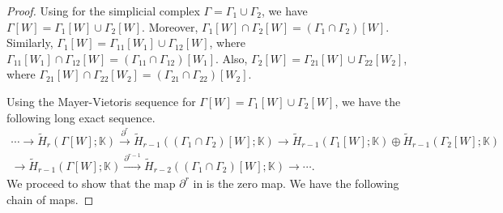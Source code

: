 \documentclass[12pt,reqno]{amsart}
\theoremstyle{definition}
\newcommand{\K}{\mathbb K}
\begin{document}
\begin{proof}
    Using  for the simplicial complex $\Gamma=\Gamma_1\cup\Gamma_2$, we have $\Gamma[W]=\Gamma_1[W]\cup\Gamma_2[W]$. Moreover, $\Gamma_1[W]\cap\Gamma_2[W]=(\Gamma_1\cap\Gamma_2)[W]$. Similarly, $\Gamma_1[W]=\Gamma_{11}[W_1]\cup\Gamma_{12}[W]$, where $\Gamma_{11}[W_1]\cap\Gamma_{12}[W]=(\Gamma_{11}\cap\Gamma_{12})[W_1]$. Also, $\Gamma_2[W]=\Gamma_{21}[W]\cup\Gamma_{22}[W_2]$, where $\Gamma_{21}[W]\cap\Gamma_{22}[W_2]=(\Gamma_{21}\cap\Gamma_{22})[W_2]$.

    Using the Mayer-Vietoris sequence for $\Gamma[W]=\Gamma_1[W]\cup\Gamma_2[W]$, we have the following long exact sequence.
{\footnotesize
    \begin{equation}\label{eq1}
    \begin{split}
        \cdots \rightarrow \widetilde H_r(\Gamma[W];\K)\xrightarrow{\partial^r} \widetilde H_{r-1}((\Gamma_1\cap\Gamma_2)[W];\K)\rightarrow \widetilde H_{r-1}(\Gamma_1[W];\K)\oplus \widetilde H_{r-1}(\Gamma_2[W];\K) \\
        \rightarrow \widetilde H_{r-1}(\Gamma[W];\K)\xrightarrow{\partial^{r-1}} \widetilde H_{r-2}((\Gamma_1\cap\Gamma_2)[W];\K)\rightarrow\cdots.
    \end{split}
    \end{equation}}
    We proceed to show that the map $\partial^r$ in  is the zero map. We have the following chain of maps.
    
    {\scriptsize
{}}


\end{proof}
\end{document}

